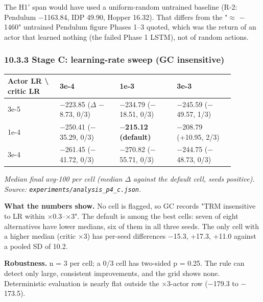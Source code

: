 \documentclass[11pt]{article}
\begin{document}
The H1$'$ span would have used a uniform-random untrained baseline (R-2: Pendulum $-$1163.84, IDP 49.90, Hopper 16.32). That differs from the "$\approx$ $-$1460" untrained Pendulum figure Phases 1--3 quoted, which was the return of an actor that learned nothing (the failed Phase 1 LSTM), not of random actions.



\subsubsection*{10.3.3 Stage C: learning-rate sweep (GC insensitive)}



\begin{center}\small\begin{tabular}{>{\raggedright\arraybackslash}p{0.209\linewidth}>{\raggedleft\arraybackslash}p{0.230\linewidth}>{\raggedleft\arraybackslash}p{0.220\linewidth}>{\raggedleft\arraybackslash}p{0.220\linewidth}}
\toprule
Actor LR \textbackslash{} critic LR & 3e-4 & 1e-3 & 3e-3 \\
\midrule
3e-5 & $-$223.85 ($\Delta$ $-$8.73, 0/3) & $-$234.79 ($-$18.51, 0/3) & $-$245.59 ($-$49.57, 1/3) \\
1e-4 & $-$250.41 ($-$35.29, 0/3) & \textbf{$-$215.12 (default)} & $-$208.79 (+10.95, 2/3) \\
3e-4 & $-$261.45 ($-$41.72, 0/3) & $-$270.82 ($-$55.71, 0/3) & $-$244.75 ($-$48.73, 0/3) \\
\bottomrule
\end{tabular}\end{center}



\emph{Median final avg-100 per cell (median $\Delta$ against the default cell, seeds positive). Source: \texttt{experiments/\allowbreak{}analysis\_\allowbreak{}p4\_\allowbreak{}c.\allowbreak{}json}.}



\textbf{What the numbers show.} No cell is flagged, so GC records "TRM insensitive to LR within $\times$0.3--$\times$3". The default is among the best cells: seven of eight alternatives have lower medians, six of them in all three seeds. The only cell with a higher median (critic $\times$3) has per-seed differences $-$15.3, +17.3, +11.0 against a pooled SD of 10.2.



\textbf{Robustness.} n = 3 per cell; a 0/3 cell has two-sided p = 0.25. The rule can detect only large, consistent improvements, and the grid shows none. Deterministic evaluation is nearly flat outside the $\times$3-actor row ($-$179.3 to $-$173.5).
\end{document}
